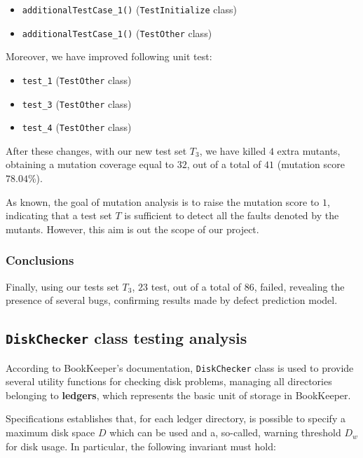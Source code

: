 \documentclass[sigconf]{acmart}
\begin{document}
\begin{itemize}
\item \texttt{additionalTestCase\_1()} (\texttt{TestInitialize} class)
\item \texttt{additionalTestCase\_1()} (\texttt{TestOther} class)
\end{itemize}

Moreover, we have improved following unit test:

\begin{itemize}
\item \texttt{test\_1} (\texttt{TestOther} class)
\item \texttt{test\_3} (\texttt{TestOther} class)
\item \texttt{test\_4} (\texttt{TestOther} class)
\end{itemize}

After these changes, with our new test set $T_3$, we have killed $4$ extra mutants, obtaining a mutation coverage equal to $32$, out of a total of $41$ (mutation score $78.04 \%$).

As known, the goal of mutation analysis is to raise the mutation score to $1$, indicating that a test set $T$ is sufficient to detect all the faults denoted by the mutants\cite{mutation}. However, this aim is out the scope of our project.

\subsubsection{Conclusions}

Finally, using our tests set $T_3$, $23$ test, out of a total of $86$, failed, revealing the presence of several bugs, confirming results made by defect prediction model.


\newpage
\subsection{\texttt{DiskChecker} class testing analysis}

According to BookKeeper's documentation, \texttt{DiskChecker} class is used to provide several utility functions for checking disk problems, managing all directories belonging to \textbf{ledgers}, which represents the basic unit of storage in BookKeeper\cite{BookKeeperArchitecture}. 

Specifications establishes that, for each ledger directory, is possible to specify a maximum disk space $D$ which can be used and a, so-called, warning threshold $D_w$ for disk usage\cite{BookKeeperConfiguration}. In particular, the following invariant must hold:
\end{document}
